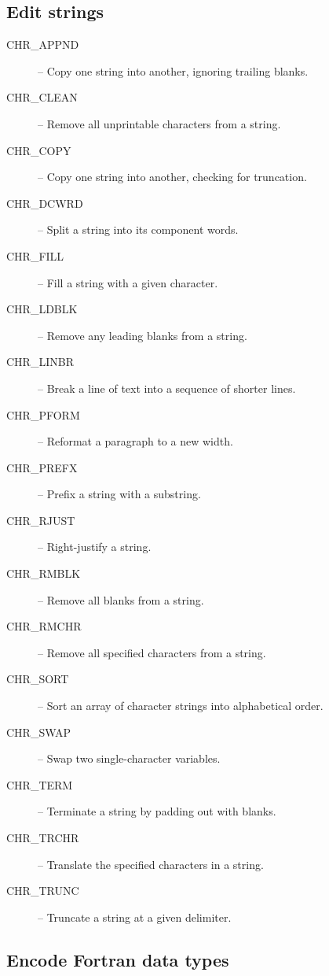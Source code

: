\subsection {Edit strings}

\begin {description}
\item [CHR\_APPND] -- Copy one string into another, ignoring trailing blanks.
\item [CHR\_CLEAN] -- Remove all unprintable characters from a string.
\item [CHR\_COPY] -- Copy one string into another, checking for truncation.
\item [CHR\_DCWRD] -- Split a string into its component words.
\item [CHR\_FILL] -- Fill a string with a given character.
\item [CHR\_LDBLK] -- Remove any leading blanks from a string.
\item [CHR\_LINBR] -- Break a line of text into a sequence of shorter lines.
\item [CHR\_PFORM] -- Reformat a paragraph to a new width.
\item [CHR\_PREFX] -- Prefix a string with a substring.
\item [CHR\_RJUST] -- Right-justify a string.
\item [CHR\_RMBLK] -- Remove all blanks from a string.
\item [CHR\_RMCHR] -- Remove all specified characters from a string.
\item [CHR\_SORT] -- Sort an array of character strings into alphabetical order.
\item [CHR\_SWAP] -- Swap two single-character variables.
\item [CHR\_TERM] -- Terminate a string by padding out with blanks.
\item [CHR\_TRCHR] -- Translate the specified characters in a string.
\item [CHR\_TRUNC] -- Truncate a string at a given delimiter.
\end {description}


\subsection {Encode Fortran data types}

